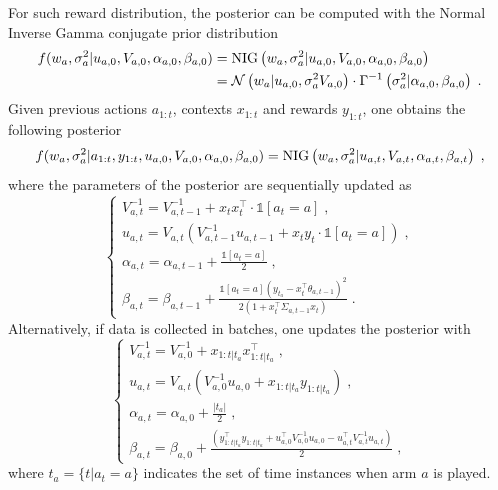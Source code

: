 \documentclass{article}
\newcommand{\N}[1]{\mathcal{N}\left( #1\right)}
\newcommand{\NIG}[1]{{\rm NIG}\left( #1\right)}
\begin{document}
For such reward distribution, the posterior can be computed with the Normal Inverse Gamma conjugate prior distribution
\begin{equation}
\begin{split}
f(w_a, \sigma_a^2|u_{a,0}, V_{a,0},\alpha_{a,0}, \beta_{a,0}) &= \NIG{w_a, \sigma_a^2|u_{a,0}, V_{a,0},\alpha_{a,0}, \beta_{a,0}} \\
& = \N{w_a|u_{a,0}, \sigma_a^2 V_{a,0}} \cdot \Gamma^{-1}\left(\sigma_a^2|\alpha_{a,0}, \beta_{a,0}\right) \;. \\
\end{split}
\end{equation}
Given previous actions $a_{1:t}$, contexts $x_{1:t}$ and rewards $y_{1:t}$, one obtains the following posterior 
\begin{equation}
f(w_a, \sigma_a^2|a_{1:t},y_{1:t},u_{a,0}, V_{a,0},\alpha_{a,0}, \beta_{a,0}) =\NIG{w_a, \sigma_a^2|u_{a,t}, V_{a,t},\alpha_{a,t}, \beta_{a,t}} \; ,
\end{equation}
where the parameters of the posterior are sequentially updated as
\begin{equation}
\begin{cases}
V_{a,t}^{-1} = V_{a,t-1}^{-1} + x_t x_t^\top \cdot \mathds{1}[a_t=a] \; ,\\
u_{a,t}= V_{a,t} \left( V_{a,t-1}^{-1} u_{a,t-1} + x_t y_{t}\cdot \mathds{1}[a_t=a]\right) \; ,\\
\alpha_{a,t}=\alpha_{a,t-1} + \frac{\mathds{1}[a_t=a]}{2} \; ,\\
\beta_{a,t}=\beta_{a,t-1} + \frac{\mathds{1}[a_t=a](y_{t_a}-x_t^\top\theta_{a,t-1})^2}{2\left(1+x_t^\top \Sigma_{a,t-1} x_t\right)} \; .
\end{cases}
\end{equation}
Alternatively, if data is collected in batches, one updates the posterior with
\begin{equation}
\begin{cases}
V_{a,t}^{-1}= V_{a,0}^{-1}+x_{{1:t}|t_a} x_{{1:t}|t_a}^\top \; ,\\
u_{a,t}=V_{a,t}\left(V_{a,0}^{-1}u_{a,0}+x_{{1:t}|t_a} y_{{1:t}|t_a}\right) \; ,\\
\alpha_{a,t}=\alpha_{a,0} + \frac{|t_a|}{2} \; ,\\
\beta_{a,t}=\beta_{a,0} + \frac{\left(y_{{1:t}|t_a}^\top y_{{1:t}|t_a} + u_{a,0}^\top V_{a,0}^{-1}u_{a,0} - u_{a,t}^\top V_{a,t}^{-1}u_{a,t} \right)}{2} \; ,
\end{cases}
\end{equation}
where $t_a=\{t|a_t=a\}$ indicates the set of time instances when arm $a$ is played.
\end{document}
